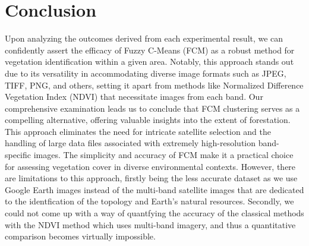 \documentclass[12pt,a4paper,IEEEtran]{article}
\begin{document}


\section{Conclusion}
Upon analyzing the outcomes derived from each experimental result, we can confidently assert the efficacy of Fuzzy C-Means (FCM) as a robust method for vegetation identification within a given area. Notably, this approach stands out due to its versatility in accommodating diverse image formats such as JPEG, TIFF, PNG, and others, setting it apart from methods like Normalized Difference Vegetation Index (NDVI) that necessitate images from each band. Our comprehensive examination leads us to conclude that FCM clustering serves as a compelling alternative, offering valuable insights into the extent of forestation. This approach eliminates the need for intricate satellite selection and the handling of large data files associated with extremely high-resolution band-specific images. The simplicity and accuracy of FCM make it a practical choice for assessing vegetation cover in diverse environmental contexts. However, there are limitations to this approach, firstly being the less accurate dataset as we use Google Earth images instead of the multi-band satellite images that are dedicated to the identfication of the topology and Earth's natural resources. Secondly, we could not come up with a way of quantfying the accuracy of the classical methods with the NDVI method which uses multi-band imagery, and thus a quantitative comparison becomes virtually impossible. 
\end{document}
